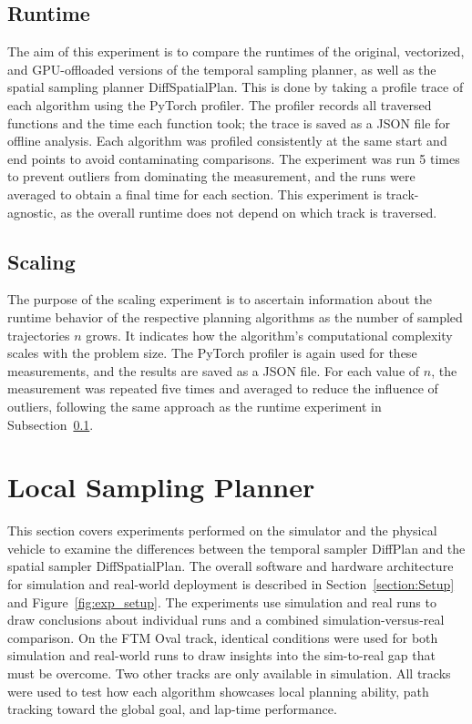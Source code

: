 \subsection{Runtime}
\label{subsection:Runtime}

The aim of this experiment is to compare the runtimes of the original, vectorized, and GPU-offloaded versions of the temporal sampling planner, as well as the spatial sampling planner DiffSpatialPlan.
This is done by taking a profile trace of each algorithm using the PyTorch profiler.
The profiler records all traversed functions and the time each function took; the trace is saved as a JSON file for offline analysis.
Each algorithm was profiled consistently at the same start and end points to avoid contaminating comparisons.
The experiment was run 5 times to prevent outliers from dominating the measurement, and the runs were averaged to obtain a final time for each section.
This experiment is track-agnostic, as the overall runtime does not depend on which track is traversed.

\subsection{Scaling}
\label{subsection:Scaling}

The purpose of the scaling experiment is to ascertain information about the runtime behavior of the respective planning algorithms as the number of sampled trajectories $n$ grows.
It indicates how the algorithm's computational complexity scales with the problem size.
The PyTorch profiler is again used for these measurements, and the results are saved as a JSON file.
For each value of $n$, the measurement was repeated five times and averaged to reduce the influence of outliers, following the same approach as the runtime experiment in Subsection~\ref{subsection:Runtime}.

\section{Local Sampling Planner}
\label{section:DiffPlanAndDiffSpatialPlan}

This section covers experiments performed on the simulator and the physical vehicle to examine the differences between the temporal sampler DiffPlan and the spatial sampler DiffSpatialPlan.
The overall software and hardware architecture for simulation and real-world deployment is described in Section~\ref{section:Setup} and Figure~\ref{fig:exp_setup}.
The experiments use simulation and real runs to draw conclusions about individual runs and a combined simulation-versus-real comparison.
On the FTM Oval track, identical conditions were used for both simulation and real-world runs to draw insights into the sim-to-real gap that must be overcome.
Two other tracks are only available in simulation.
All tracks were used to test how each algorithm showcases local planning ability, path tracking toward the global goal, and lap-time performance.

